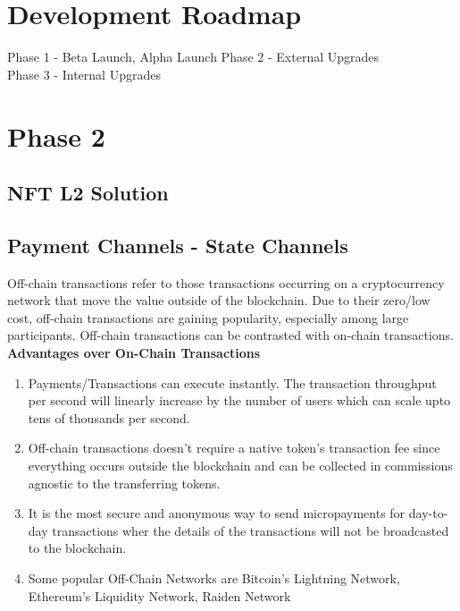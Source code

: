 \documentclass[10pt]{article}
\begin{document}
\section{Development Roadmap}

Phase 1 - Beta Launch, Alpha Launch
Phase 2 - External Upgrades\\
Phase 3 - Internal Upgrades\\

\section{Phase 2}

\subsection{NFT L2 Solution}

\subsection{Payment Channels - State Channels}

Off-chain transactions refer to those transactions occurring on a cryptocurrency network that move the value outside of the blockchain. Due to their zero/low cost, off-chain transactions are gaining popularity, especially among large participants. Off-chain transactions can be contrasted with on-chain transactions.\\

\textbf{Advantages over On-Chain Transactions}\\
\begin{enumerate}[leftmargin=+0.2in]
\item Payments/Transactions can execute instantly. The transaction throughput per second will linearly increase by the number of users which can scale upto tens of thousands per second.
\item Off-chain transactions doesn’t require a native token's transaction fee since everything occurs outside the blockchain and can be collected in commissions agnostic to the transferring tokens.
\item It is the most secure and anonymous way to send micropayments for day-to-day transactions wher the details of the transactions will not be broadcasted to the blockchain.
\item Some popular Off-Chain Networks are Bitcoin’s Lightning Network, Ethereum’s Liquidity Network, Raiden Network
\end{enumerate}
\end{document}
